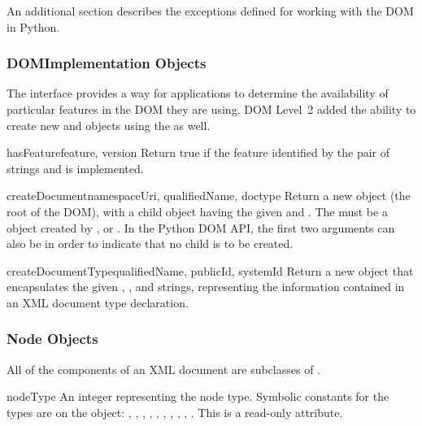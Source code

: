 An additional section describes the exceptions defined for working
with the DOM in Python.


\subsubsection{DOMImplementation Objects
               \label{dom-implementation-objects}}

The  interface provides a way for
applications to determine the availability of particular features in
the DOM they are using.  DOM Level~2 added the ability to create new
 and  objects using the
 as well.

\begin{methoddesc}[DOMImplementation]{hasFeature}{feature, version}
Return true if the feature identified by the pair of strings
 and  is implemented.
\end{methoddesc}

\begin{methoddesc}[DOMImplementation]{createDocument}{namespaceUri, qualifiedName, doctype}
Return a new  object (the root of the DOM), with a
child  object having the given  and
. The  must be a 
object created by , or .
In the Python DOM API, the first two arguments can also be 
in order to indicate that no  child is to be created.
\end{methoddesc}

\begin{methoddesc}[DOMImplementation]{createDocumentType}{qualifiedName, publicId, systemId}
Return a new  object that encapsulates the given
, , and  strings,
representing the information contained in an XML document type
declaration.
\end{methoddesc}


\subsubsection{Node Objects \label{dom-node-objects}}

All of the components of an XML document are subclasses of
.

\begin{memberdesc}[Node]{nodeType}
An integer representing the node type.  Symbolic constants for the
types are on the  object:
, ,
, ,
, ,
, ,
, .
This is a read-only attribute.
\end{memberdesc}

